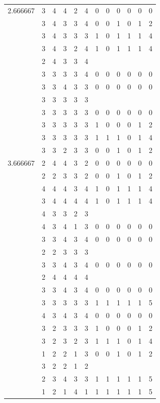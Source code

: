 \documentclass[]{book}
\theoremstyle{definition}
\theoremstyle{definition}
\theoremstyle{definition}
\theoremstyle{remark}
\begin{document}
\begin{table}
{\begin{tabular}[t]{rrrrrrrrrrrr}
2.666667 & 3 & 4 & 4 & 2 & 4 & 0 & 0 & 0 & 0 & 0 & 0\\
 & 3 & 4 & 3 & 3 & 4 & 0 & 0 & 1 & 0 & 1 & 2\\
 & 3 & 4 & 3 & 3 & 3 & 1 & 0 & 1 & 1 & 1 & 4\\
 & 3 & 4 & 3 & 2 & 4 & 1 & 0 & 1 & 1 & 1 & 4\\
 & 2 & 4 & 3 & 3 & 4 &  &  &  &  &  & \\
 & 3 & 3 & 3 & 3 & 4 & 0 & 0 & 0 & 0 & 0 & 0\\
 & 3 & 3 & 4 & 3 & 3 & 0 & 0 & 0 & 0 & 0 & 0\\
 & 3 & 3 & 3 & 3 & 3 &  &  &  &  &  & \\
 & 3 & 3 & 3 & 3 & 3 & 0 & 0 & 0 & 0 & 0 & 0\\
 & 3 & 3 & 3 & 3 & 3 & 1 & 0 & 0 & 0 & 1 & 2\\
 & 3 & 3 & 3 & 3 & 3 & 1 & 1 & 1 & 0 & 1 & 4\\
 & 3 & 3 & 2 & 3 & 3 & 0 & 0 & 1 & 0 & 1 & 2\\
3.666667 & 2 & 4 & 4 & 3 & 2 & 0 & 0 & 0 & 0 & 0 & 0\\
 & 2 & 2 & 3 & 3 & 2 & 0 & 0 & 1 & 0 & 1 & 2\\
 & 4 & 4 & 4 & 3 & 4 & 1 & 0 & 1 & 1 & 1 & 4\\
 & 3 & 4 & 4 & 4 & 4 & 1 & 0 & 1 & 1 & 1 & 4\\
 & 4 & 3 & 3 & 2 & 3 &  &  &  &  &  & \\
 & 4 & 3 & 4 & 1 & 3 & 0 & 0 & 0 & 0 & 0 & 0\\
 & 3 & 3 & 4 & 3 & 4 & 0 & 0 & 0 & 0 & 0 & 0\\
 & 2 & 2 & 3 & 3 & 3 &  &  &  &  &  & \\
 & 3 & 3 & 4 & 3 & 4 & 0 & 0 & 0 & 0 & 0 & 0\\
 & 2 & 4 & 4 & 4 & 4 &  &  &  &  &  & \\
 & 3 & 3 & 4 & 3 & 4 & 0 & 0 & 0 & 0 & 0 & 0\\
 & 3 & 3 & 3 & 3 & 3 & 1 & 1 & 1 & 1 & 1 & 5\\
 & 4 & 3 & 4 & 3 & 4 & 0 & 0 & 0 & 0 & 0 & 0\\
 & 3 & 2 & 3 & 3 & 3 & 1 & 0 & 0 & 0 & 1 & 2\\
 & 3 & 2 & 3 & 2 & 3 & 1 & 1 & 1 & 0 & 1 & 4\\
 & 1 & 2 & 2 & 1 & 3 & 0 & 0 & 1 & 0 & 1 & 2\\
 & 3 & 2 & 2 & 1 & 2 &  &  &  &  &  & \\
 & 2 & 3 & 4 & 3 & 3 & 1 & 1 & 1 & 1 & 1 & 5\\
 & 1 & 2 & 1 & 4 & 1 & 1 & 1 & 1 & 1 & 1 & 5\\

\end{tabular}}
\end{table}
\end{document}

